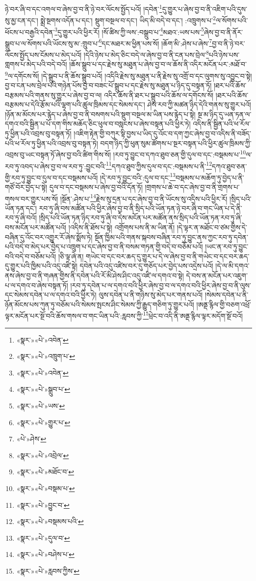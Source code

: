 ཉེ་བར་ཞི་བ་དང་འགལ་བ་ཞེས་བྱ་བ་ནི་ཉེ་བར་ལོངས་སྤྱོད་པའོ། །དབེན་\footnote{«སྣར་»«པེ་»འབེན་}དུ་གྱུར་པ་ཞེས་བྱ་བ་ནི་འཇིག་པའི་དུས་སུ་མྱ་ངན་དང་། སྨྲེ་སྔགས་འདོན་པ་དང་། སྡུག་བསྔལ་བ་དང་། ཡིད་མི་བདེ་བ་དང་། :འཁྲུགས་པ་\footnote{«སྣར་»«པེ་»འཁྲུག་པ་}ལ་སོགས་པའི་ཕོངས་པ་བརྒྱའི་དབེན་\footnote{«སྣར་»«པེ་»འབེན་}དུ་གྱུར་པའི་ཕྱིར་རོ། །སོ་ཚིས་ཀྱི་ལས་:བསྒྲུབ་པ་\footnote{«སྣར་»«པེ་»སྒྲུབ་པ་}མཐའ་:ཡས་པས་\footnote{«སྣར་»«པེ་»ཡས་}ཞེས་བྱ་བ་ནི་ནོར་སྒྲུབ་པ་ལ་སོགས་པའི་ཡོངས་སུ་མ་:གྲུབ་པ་\footnote{«སྣར་»«པེ་»གྱུར་པ་}དང་མཐར་མ་ཕྱིན་པས་སོ། །ཆོག་མི་:ཤེས་པ་ཞེས་\footnote{«པེ་»ཤེས་}བྱ་བ་ནི་ཉེ་བར་ལོངས་སྤྱོད་པས་ངོམས་པ་མེད་པའོ། །དེའི་ཉེས་པ་མེད་ཅིང་བདེ་ལ་ཞེས་བྱ་བ་ནི་ངན་པས་བྲེལ་\footnote{«སྣར་»«པེ་»འབྲེལ་}པའི་ཉེས་པས་གླགས་པ་མེད་པའི་བདེ་བའོ། །ཆོས་སྒྲུབ་པ་དང་རྗེས་སུ་མཐུན་པ་ཞེས་བྱ་བ་ལ་ཆོས་ནི་འདིར་མངོན་པར་:མཐོ་བ་\footnote{«སྣར་»«པེ་»མཐོང་བ་}ལ་དགོངས་སོ། །དེ་སྒྲུབ་པ་ནི་ཆོས་སྒྲུབ་པའོ། །འདིའི་རྗེས་སུ་མཐུན་པ་ནི་རྗེས་སུ་འགྲོ་བ་དང་ལུགས་སུ་འབྱུང་བ་སྟེ། བྱ་བ་ངན་པས་བྲེལ་པའི་གཉེན་པོས་བྱ་བ་བཟང་པོ་སྒྲུབ་པ་དང་རྗེས་སུ་མཐུན་པ་ཉིད་དུ་བསྟན་ཏོ། །ཐར་པའི་ཆོས་བརྩམས་པའི་གནས་སུ་གྱུར་པ་ཞེས་བྱ་བ་ལ། འདིར་ཆོས་ནི་ཐར་པ་སྒྲུབ་པའི་ཆོས་ལ་དགོངས་སོ། །ཐར་པའི་ཆོས་བརྩམས་པ་དེའི་རྩོམ་པའི་ལྷག་པའི་ཚུལ་ཁྲིམས་དང་སེམས་དང་། ཤེས་རབ་ཀྱི་མཚན་ཉིད་དེའི་གནས་སུ་གྱུར་པའོ། །ཉོན་མ་མོངས་པར་རྙེད་པ་ཞེས་བྱ་བ་ནི་བསགས་པའི་སྡུག་བསྔལ་མ་ཡིན་པས་རྙེད་པ་སྟེ། སྔ་མ་ཉིད་དུ་ཡན་ཏན་ལ་དགའ་བའི་སྦྱིན་པ་པོ་དག་གིས་མཆོད་ཅིང་ཕུལ་བ་བསླངས་པ་ཞེས་བསྟན་པའི་ཕྱིར་ཏེ། འདིས་ནི་སྦྱིན་པའི་ཕ་རོལ་ཏུ་ཕྱིན་པའི་འབྲས་བུ་བསྟན་ཏོ། །འཇིག་རྟེན་གྱི་བཀུར་སྟི་བྱས་པ་ཡིད་དུ་འོང་བ་དག་ཀྱང་ཞེས་བྱ་བ་འདིས་ནི་བཟོད་པའི་ཕ་རོལ་ཏུ་ཕྱིན་པའི་འབྲས་བུ་བསྟན་ཏེ། བདག་ཉིད་ཀྱི་ཕུན་སུམ་ཚོགས་པ་སྔར་བསྟན་པའི་ཕྱིར་ཚུལ་ཁྲིམས་ཀྱི་འབྲས་བུ་ཡང་བསྟན་ཏོ་ཞེས་བྱ་བའི་ཚིག་གིས་སོ། །རབ་ཏུ་བྱུང་བ་དཀའ་ཐུབ་ཅན་གྱི་དུལ་བ་དང་:བསྡམས་པ་\footnote{«སྣར་»«པེ་»བསྡམ་པ་}ལ་རབ་ཏུ་འབད་པ་ཞེས་བྱ་བ་ལ་རབ་ཏུ་:བྱུང་བའི་\footnote{«སྣར་»«པེ་»བྱུང་བ་}དཀའ་ཐུབ་ཀྱིས་དུལ་བ་དང་:བསྡམས་པ་ནི་\footnote{«སྣར་»«པེ་»བསྡམས་པའི་}དཀའ་ཐུབ་ཅན་གྱི་རབ་ཏུ་བྱུང་བ་དུལ་བ་དང་བསྡམས་པའོ། །དེ་རབ་ཏུ་བྱུང་བའི་:དུལ་བ་དང་\footnote{«སྣར་»«པེ་»དུལ་བ་}བསྡམས་པ་མཆོག་ཏུ་བྱེད་པ་ནི་གཙོ་བོར་བྱེད་པ་སྟེ། དུལ་བ་དང་བསྡམས་པ་ཞེས་བྱ་བའི་དོན་ཏོ། །གྲགས་པ་ཆེ་བ་དང་ཞེས་བྱ་བ་ནི་གྲགས་པ་གསལ་བར་གྱུར་པས་སོ། །སྔོན་:ཤེས་པ་\footnote{«སྣར་»«པེ་»བཤེས་པ་}རྗེས་སུ་དྲན་པ་དང་ཞེས་བྱ་བ་ནི་ཡོངས་སུ་འདྲིས་པའི་ཕྱིར་རོ། །སྲིད་པའི་ཡོན་ཏན་དང་། རབ་ཏུ་ཞི་བས་མཚོན་པའི་ཕྱིར་ཞེས་བྱ་བ་ནི་སྲིད་པའི་ཡོན་ཏན་ཉེ་བར་ཞི་བ་གང་ཡིན་པ་དེ་ནི་རབ་ཏུ་ཞི་བའོ། །སྲིད་པའི་ཡོན་ཏན་ཉིད་རབ་ཏུ་ཞི་བ་དེས་མངོན་པར་མཚོན་ནས་སྲིད་པའི་ཡོན་ཏན་རབ་ཏུ་ཞི་བས་མངོན་པར་མཚོན་པའོ། །འདིས་ནི་ཐོས་པ་སྟེ། འགྲོགས་པས་ནི་མ་ཡིན་ནོ། །དེ་ལྟར་ན་མཐོང་བ་ཙམ་གྱིས་དེ་བཞིན་དུ་འོང་བར་འགྱུར་རོ་ཞེས་སྨོས་ཏེ། སྔོན་ཁྱིམ་པའི་གནས་སྐབས་བཞིན་རབ་ཏུ་བྱུང་ནས་ཀྱང་རབ་ཏུ་དབེན་པའི་བདེ་བ་མེད་པར་བྱེད་པ་འཁྲུག་པ་དང་ཞེས་བྱ་བ་ནི་བསམ་གཏན་གྱི་བདེ་བ་བཅོམ་པའོ། །ཡང་ན་རབ་ཏུ་བྱུང་བའི་བདེ་བ་བཅོམ་པའོ། །ཅི་ལྟ་ཞེ་ན། གཡེང་བ་དང་བར་ཆད་དུ་གྱུར་པ་དེ་ལ་ཞེས་བྱ་བ་ནི་གཡེང་བ་དང་བར་ཆད་དུ་གྱུར་པའི་ཁྱིམ་པའི་འདུ་འཛི་སྟེ། དབེན་པའི་འདུ་འཛིས་བར་དུ་གཅོད་པར་བྱེད་པས་འདྲེས་པའོ། །དེ་ལ་མི་དགའ་ནས་ཞེས་བྱ་བ་ནི་གཞན་གྱིས་ནི་དབེན་པའི་རོ་མི་ཤེས་ཤིང་འདུ་འཛི་ལ་དགའ་བ་སྟེ། དེ་བས་ན་མངོན་པར་འཇུག་པ་ལ་དགའ་བ་ཞེས་བསྟན་ཏོ། །རབ་ཏུ་དབེན་པ་ལ་དགའ་བའི་ཕྱིར་ཞེས་བྱ་བ་ལ་དགའ་བའི་ཕྱིར་ཞེས་བྱ་བ་ནི་ལུས་དང་སེམས་དབེན་པ་ལ་དགའ་བའི་ཕྱིར་ཏེ། ལུས་དབེན་པ་ནི་གཉིས་སུ་མེད་པར་གནས་པའོ། །སེམས་དབེན་པ་ནི་ཉོན་མོངས་པས་ཀུན་ཏུ་བཅོམ་པའི་སེམས་སྤངས་ཤིང་སེམས་ཀྱི་རྒྱུད་གཅིག་ཏུ་གྱུར་པའོ། །ཨནྡ་རྙིལ་གྱི་བཅག་འཕྲོ་ལྟར་མངོན་པར་སྔོ་བའི་ཆོས་གསལ་བ་གང་ཡིན་པའི་:རླབས་ཀྱི་\footnote{«སྣར་»«པེ་»རླབས་ཀྱིས་}ཕྲེང་བ་འདི་ནི་ཨནྡ་རྙིལ་ལྟར་མདོག་སྔོ་བའོ། 